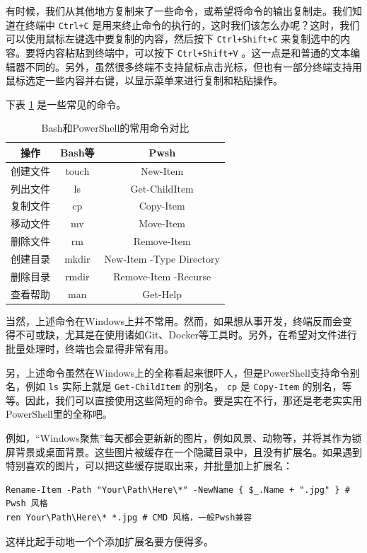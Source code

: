 有时候，我们从其他地方复制来了一些命令，或希望将命令的输出复制走。我们知道在终端中 \texttt{Ctrl+C} 是用来终止命令的执行的，这时我们该怎么办呢？这时，我们可以使用鼠标左键选中要复制的内容，然后按下 \texttt{Ctrl+Shift+C} 来复制选中的内容。要将内容粘贴到终端中，可以按下 \texttt{Ctrl+Shift+V} 。这一点是和普通的文本编辑器不同的。另外，虽然很多终端不支持鼠标点击光标，但也有一部分终端支持用鼠标选定一些内容并右键，以显示菜单来进行复制和粘贴操作。

下表 \ref{tab:terminal-commands} 是一些常见的命令。

\begin{table}[ht]
    \centering
    \begin{tabular}{c|cc}
        \hline
        \textbf{操作} & \textbf{Bash等} & \textbf{Pwsh} \\
        \hline
        创建文件 & touch & New-Item \\
        列出文件 & ls & Get-ChildItem \\
        复制文件 & cp & Copy-Item \\
        移动文件 & mv & Move-Item \\
        删除文件 & rm & Remove-Item \\
        创建目录 & mkdir & New-Item -Type Directory \\
        删除目录 & rmdir & Remove-Item -Recurse \\
        查看帮助 & man & Get-Help \\
        \hline
    \end{tabular}
    \caption{Bash和PowerShell的常用命令对比}
    \label{tab:terminal-commands}
\end{table}

当然，上述命令在Windows上并不常用。然而，如果想从事开发，终端反而会变得不可或缺，尤其是在使用诸如Git、Docker等工具时。另外，在希望对文件进行批量处理时，终端也会显得非常有用。

另，上述命令虽然在Windows上的全称看起来很吓人，但是PowerShell支持命令别名，例如 \texttt{ls} 实际上就是 \texttt{Get-ChildItem} 的别名， \texttt{cp} 是 \texttt{Copy-Item} 的别名，等等。因此，我们可以直接使用这些简短的命令。要是实在不行，那还是老老实实用PowerShell里的全称吧。

例如，“Windows聚焦”每天都会更新新的图片，例如风景、动物等，并将其作为锁屏背景或桌面背景。这些图片被缓存在一个隐藏目录中，且没有扩展名。如果遇到特别喜欢的图片，可以把这些缓存提取出来，并批量加上扩展名：
\begin{verbatim}
Rename-Item -Path "Your\Path\Here\*" -NewName { $_.Name + ".jpg" } # Pwsh 风格
ren Your\Path\Here\* *.jpg # CMD 风格，一般Pwsh兼容
\end{verbatim}
这样比起手动地一个个添加扩展名要方便得多。

